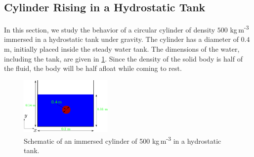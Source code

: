 



\FloatBarrier%
\subsection{Cylinder Rising in a Hydrostatic Tank}
\label{sec:water-entry-sphere}
In this section, we study the behavior of a circular cylinder of density $500$
kg\,m\textsuperscript{-3} immersed in a hydrostatic tank under gravity. The
cylinder has a diameter of $0.4$ m, initially placed inside the steady water
tank. The dimensions of the water, including the tank, are given in
\cref{fig:water-entry-sphere-schematic}. Since the density of the solid body is
half of the fluid, the body will be half afloat while coming to rest.
\begin{figure}[!htpb]
  \centering
  \includegraphics[width=0.4\textwidth]{images/rfc/images/water_entry_of_sphere/schematic}
  \caption{Schematic of an immersed cylinder of 500 kg\,m\textsuperscript{-3}
    in a hydrostatic tank.}
\label{fig:water-entry-sphere-schematic}
\end{figure}

